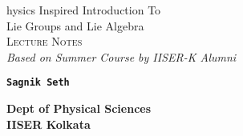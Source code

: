 \documentclass{scrartcl}
\begin{document}
\makeatletter
\begin{titlepage}
    \vspace*{2cm}
    
        \begin{center}
            {\rmfamily
                \Huge{\textcolor{blue!30!black}{%
                    \textmd{{}}hysics {\HUGE I}nspired {\HUGE I}ntroduction {\HUGE T}o  \\
                     {\HUGE L}ie {\HUGE G}roups and {\HUGE L}ie {\HUGE A}lgebra%
                }}\\[0.7cm]
                
                
                \Large \textsc{Lecture Notes} \\[0.3cm]
               \Large \textit{Based on Summer Course by IISER-K Alumni}\\[0.7cm]

            }
            \end{center}
       
        \begin{figure}[H]
            \centering
          
        \end{figure}
        \vspace{1cm}
        \begin{center}
           \Large \texttt{\textbf{{\LARGE  S}agnik {\LARGE S}eth }}
        \end{center}
        \vspace{0.5cm}
      \begin{center}
    \textbf{ Dept of Physical Sciences} \\
    \textbf{IISER Kolkata}
    \vspace{0.5cm}

   
\end{center}

\end{titlepage}

  
       
\tableofcontents
\newpage


\end{document}
